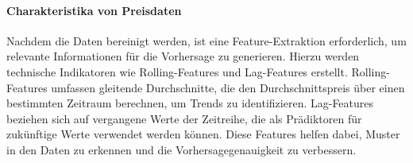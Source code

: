 \paragraph{Charakteristika von Preisdaten}
Nachdem die Daten bereinigt werden, ist eine Feature-Extraktion erforderlich, um relevante Informationen für die Vorhersage zu generieren. Hierzu werden technische Indikatoren wie Rolling-Features und Lag-Features erstellt. Rolling-Features umfassen gleitende Durchschnitte, die den Durchschnittspreis über einen bestimmten Zeitraum berechnen, um Trends zu identifizieren. Lag-Features beziehen sich auf vergangene Werte der Zeitreihe, die als Prädiktoren für zukünftige Werte verwendet werden können. Diese Features helfen dabei, Muster in den Daten zu erkennen und die Vorhersagegenauigkeit zu verbessern.






